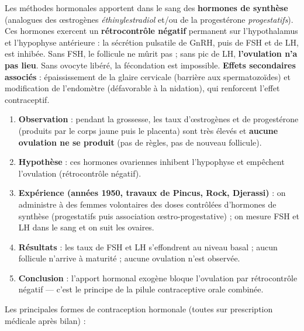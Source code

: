 \documentclass[11pt]{article}
\newcommand{\cle}[1]{{\popxbold\color{popdark}#1}}
\begin{document}
\begin{propriete}
Les méthodes hormonales apportent dans le sang des \textbf{hormones de synthèse} (analogues des œstrogènes \emph{éthinylestradiol} et/ou de la progestérone \emph{progestatifs}). Ces hormones exercent un \textbf{rétrocontrôle négatif} permanent sur l'hypothalamus et l'hypophyse antérieure : la sécrétion pulsatile de \cle{GnRH}, puis de \cle{FSH} et de \cle{LH}, est inhibée. Sans FSH, le follicule ne mûrit pas ; sans pic de LH, \textbf{l'ovulation n'a pas lieu}. Sans ovocyte libéré, la fécondation est impossible.
\textbf{Effets secondaires associés} : épaississement de la glaire cervicale (barrière aux spermatozoïdes) et modification de l'endomètre (défavorable à la nidation), qui renforcent l'effet contraceptif.
\end{propriete}

\begin{experience}
\begin{enumerate}
\item \textbf{Observation} : pendant la grossesse, les taux d'œstrogènes et de progestérone (produits par le corps jaune puis le placenta) sont très élevés et \textbf{aucune ovulation ne se produit} (pas de règles, pas de nouveau follicule).
\item \textbf{Hypothèse} : ces hormones ovariennes inhibent l'hypophyse et empêchent l'ovulation (rétrocontrôle négatif).
\item \textbf{Expérience (années 1950, travaux de Pincus, Rock, Djerassi)} : on administre à des femmes volontaires des doses contrôlées d'hormones de synthèse (progestatifs puis association œstro-progestative) ; on mesure FSH et LH dans le sang et on suit les ovaires.
\item \textbf{Résultats} : les taux de FSH et LH s'effondrent au niveau basal ; aucun follicule n'arrive à maturité ; aucune ovulation n'est observée.
\item \textbf{Conclusion} : l'apport hormonal exogène bloque l'ovulation par rétrocontrôle négatif — c'est le principe de la pilule contraceptive orale combinée.
\end{enumerate}
\end{experience}

Les principales formes de contraception hormonale (toutes sur prescription médicale après bilan) :
\end{document}
